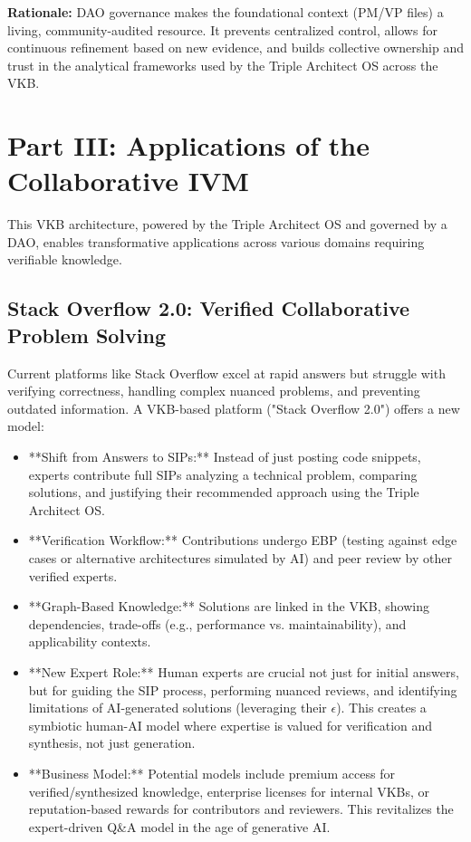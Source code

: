 \documentclass[11pt,a4paper]{article}
\theoremstyle{definition}
\theoremstyle{remark}
\begin{document}
\begin{mdframed}[backgroundcolor=cyan!5]
\textbf{Rationale:} DAO governance makes the foundational context (PM/VP files) a living, community-audited resource. It prevents centralized control, allows for continuous refinement based on new evidence, and builds collective ownership and trust in the analytical frameworks used by the Triple Architect OS across the VKB.
\end{mdframed}

\section{Part III: Applications of the Collaborative IVM}

This VKB architecture, powered by the Triple Architect OS and governed by a DAO, enables transformative applications across various domains requiring verifiable knowledge.

\subsection{Stack Overflow 2.0: Verified Collaborative Problem Solving}

Current platforms like Stack Overflow excel at rapid answers but struggle with verifying correctness, handling complex nuanced problems, and preventing outdated information. A VKB-based platform ("Stack Overflow 2.0") offers a new model:

\begin{itemize}
    \item **Shift from Answers to SIPs:** Instead of just posting code snippets, experts contribute full SIPs analyzing a technical problem, comparing solutions, and justifying their recommended approach using the Triple Architect OS.
    \item **Verification Workflow:** Contributions undergo EBP (testing against edge cases or alternative architectures simulated by AI) and peer review by other verified experts.
    \item **Graph-Based Knowledge:** Solutions are linked in the VKB, showing dependencies, trade-offs (e.g., performance vs. maintainability), and applicability contexts.
    \item **New Expert Role:** Human experts are crucial not just for initial answers, but for guiding the SIP process, performing nuanced reviews, and identifying limitations of AI-generated solutions (leveraging their $\epsilon$). This creates a symbiotic human-AI model where expertise is valued for verification and synthesis, not just generation.
    \item **Business Model:** Potential models include premium access for verified/synthesized knowledge, enterprise licenses for internal VKBs, or reputation-based rewards for contributors and reviewers. This revitalizes the expert-driven Q&A model in the age of generative AI.
\end{itemize}
\end{document}
